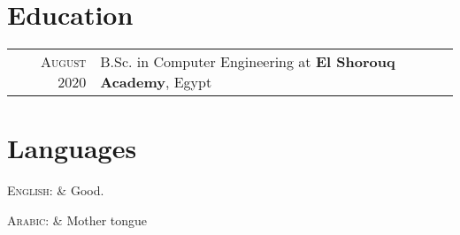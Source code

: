 \documentclass[a4paper,10pt]{article}
\begin{document}

\section{Education}

\begin{tabular}{rl}	
\textsc{August} 2020 & B.Sc. in Computer Engineering  at  \textbf{El Shorouq Academy}, Egypt\\

\end{tabular}

\section{Languages}

\begin{tabular}

\end{tabular}

\begin{minipage}[t]{0.60\textwidth} %
	\vspace{-\baselineskip} %
	
	
	\textsc{English:} & Good.\\

\end{minipage}
\begin{minipage}[t]{0.70\textwidth} %
	\vspace{-\baselineskip} %
	

\textsc{Arabic:} & Mother tongue\\
    

\end{minipage}
\end{document}
